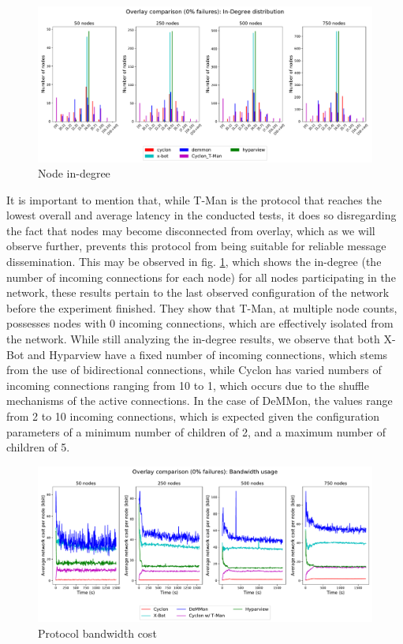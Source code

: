 \begin{figure}
    \centering
    \includegraphics[width=\linewidth]{Chapters/evaluation/figures/membership/membership_inDegree_0_failures.pdf}
    \caption{Node in-degree}
    \label{fig:overlay_proto_res_net_building:0_failures_inDegree}
\end{figure}

It is important to mention that, while T-Man is the protocol that reaches the lowest overall and average latency in the conducted tests, it does so disregarding the fact that nodes may become disconnected from overlay, which as we will observe further, prevents this protocol from being suitable for reliable message dissemination. This may be observed in fig. \ref{fig:overlay_proto_res_net_building:0_failures_inDegree}, which shows the in-degree (the number of incoming connections for each node) for all nodes participating in the network, these results pertain to the last observed configuration of the network before the experiment finished. They show that T-Man, at multiple node counts, possesses nodes with 0 incoming connections, which are effectively isolated from the network. While still analyzing the in-degree results, we observe that both X-Bot and Hyparview have a fixed number of incoming connections, which stems from the use of bidirectional connections, while Cyclon has varied numbers of incoming connections ranging from 10 to 1, which occurs due to the shuffle mechanisms of the active connections. In the case of DeMMon, the values range from 2 to 10 incoming connections, which is expected given the configuration parameters of a minimum number of children of 2, and a maximum number of children of 5.


\begin{figure}
    \centering
    \includegraphics[width=\linewidth]{Chapters/evaluation/figures/membership/membership_bw_over_time_0_failures.pdf}
    \caption{Protocol bandwidth cost}
    \label{fig:overlay_proto_res_net_building:0_failures_BWUsage}
\end{figure}

